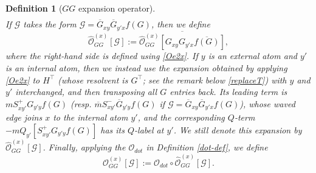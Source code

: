 \documentclass{article}
\newcommand{\1}{\mathds{1}}
\numberwithin{equation}{section}
\renewcommand{\cal}{\mathcal}
\newcommand{\wh}{\widehat}
\theoremstyle{plain} %
\newtheorem{definition}[theorem]{Definition}
\theoremstyle{remark}
\begin{document}
\begin{definition}[$G G$ expansion operator]
\begin{align}
	\end{align}
	If $\cal G$ takes the form $\cal G=\overline G_{xy}  \overline G_{y' x }  f(G)$, then we define 
	$$\wh{\cal O}_{GG}^{(x)}\left[\cal G\right]:=\overline{ \wh{\cal O}_{GG}^{(x)}\left[G_{xy}   G_{y' x }  \overline{f(G)}\right] },$$
	where the right-hand side is defined using \eqref{Oe2x}. If $y$ is an external atom and $y'$ is an internal atom, then we instead use the expansion obtained by applying \eqref{Oe2x} to $H^\top$ (whose resolvent is $G^\top$; see the remark below \eqref{replaceT}) with $y$ and $y'$ interchanged, and then transposing all $G$ entries back. Its leading term is $m S^{+}_{xy'} G_{y' y} f(G)$ (resp. $\overline m S^{-}_{xy'} \overline G_{y' y} f(G)$ if $\cal G=\overline G_{xy}  \overline G_{y' x }  f(G)$), whose waved edge joins $x$ to the internal atom $y'$, and the corresponding $Q$-term $-m Q_{y'}[S^{+}_{xy'} G_{y' y} f(G)]$ has its $Q$-label at $y'$. We still denote this expansion by $\wh{\cal O}_{GG}^{(x)}[\cal G]$. Finally, applying the $\cal O_{dot}$ in Definition \ref{dot-def}, we define
	$${\cal O}_{GG}^{(x)}[ \cal G]:= \cal O_{dot} \circ  \wh{\cal O}_{GG}^{(x)}   [\cal G]. $$
\end{definition}
\end{document}
